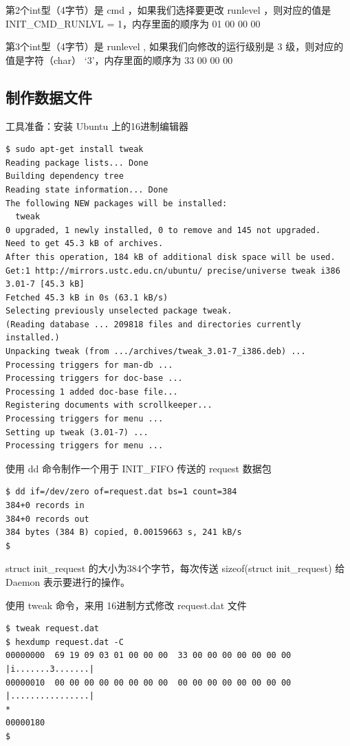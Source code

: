 第2个int型（4字节）是 cmd ，如果我们选择要更改 runlevel ，则对应的值是
INIT\_CMD\_RUNLVL = 1，内存里面的顺序为 01 00 00 00

第3个int型（4字节）是 runlevel , 如果我们向修改的运行级别是 3
级，则对应的值是字符（char） `3'，内存里面的顺序为 33 00 00 00

\subsection{制作数据文件}

工具准备：安装 Ubuntu 上的16进制编辑器

{\begin{shaded}\begin{verbatim}
$ sudo apt-get install tweak 
Reading package lists... Done
Building dependency tree       
Reading state information... Done
The following NEW packages will be installed:
  tweak
0 upgraded, 1 newly installed, 0 to remove and 145 not upgraded.
Need to get 45.3 kB of archives.
After this operation, 184 kB of additional disk space will be used.
Get:1 http://mirrors.ustc.edu.cn/ubuntu/ precise/universe tweak i386 3.01-7 [45.3 kB]
Fetched 45.3 kB in 0s (63.1 kB/s)                       
Selecting previously unselected package tweak.
(Reading database ... 209818 files and directories currently installed.)
Unpacking tweak (from .../archives/tweak_3.01-7_i386.deb) ...
Processing triggers for man-db ...
Processing triggers for doc-base ...
Processing 1 added doc-base file...
Registering documents with scrollkeeper...
Processing triggers for menu ...
Setting up tweak (3.01-7) ...
Processing triggers for menu ...
\end{verbatim}\end{shaded}}
使用 dd 命令制作一个用于 INIT\_FIFO 传送的 request 数据包

{\begin{shaded}\begin{verbatim}
$ dd if=/dev/zero of=request.dat bs=1 count=384
384+0 records in
384+0 records out
384 bytes (384 B) copied, 0.00159663 s, 241 kB/s
$ 
\end{verbatim}\end{shaded}}
struct init\_request 的大小为384个字节，每次传送 sizeof(struct
init\_request) 给 Daemon 表示要进行的操作。

使用 tweak 命令，来用 16进制方式修改 request.dat 文件

{\begin{shaded}\begin{verbatim}
$ tweak request.dat 
$ hexdump request.dat -C
00000000  69 19 09 03 01 00 00 00  33 00 00 00 00 00 00 00  |i.......3.......|
00000010  00 00 00 00 00 00 00 00  00 00 00 00 00 00 00 00  |................|
*
00000180
$ 
\end{verbatim}\end{shaded}}
